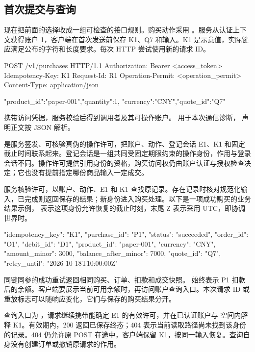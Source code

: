 \subsection*{首次提交与查询}

现在把前面的选择收成一组可检查的接口规则。购买动作采用 。服务从认证上下文获得账户 1，客户端在首次发送前保存 K1、Q7 和输入。K1 是示意值，实际键应满足公布的字符和长度要求。每次 HTTP 尝试使用新的请求 ID。

\begin{BookCode}
POST /v1/purchases HTTP/1.1
Authorization: Bearer <access_token>
Idempotency-Key: K1
Request-Id: R1
Operation-Permit: <operation_permit>
Content-Type: application/json

{"product_id":"paper-001","quantity":1,
 "currency":"CNY","quote_id":"Q7"}
\end{BookCode}

 携带访问凭据，服务校验后得到调用者及其可操作账户。 用于本次通信诊断， 声明正文按 JSON 解析。

 是服务签发、可核验真伪的操作许可，把账户、动作、登记会话 E1、K1 和固定截止时间联系起来。登记会话是一组共同受固定期限约束的操作身份，作用与登录会话不同。操作许可提供引用身份的资格，购买访问权仍由账户认证与授权检查决定；它也没有提前指定哪份商品输入一定成交。

服务核验许可，以账户、动作、E1 和 K1 查找原记录。存在记录时核对规范化输入，已完成则返回保存的结果；新身份进入购买处理。以下是一项成功购买的业务结果示例， 表示这项身份允许恢复的截止时刻，末尾 Z 表示采用 UTC，即协调世界时。

\begin{BookCode}
{
  "idempotency_key": "K1",
  "purchase_id": "P1",
  "status": "succeeded",
  "order_id": "O1",
  "debit_id": "D1",
  "product_id": "paper-001",
  "currency": "CNY",
  "amount_minor": 3000,
  "balance_after_minor": 7000,
  "quote_id": "Q7",
  "retry_until": "2026-10-18T10:00:00Z"
}
\end{BookCode}

同键同参的成功重试返回相同购买、订单、扣款和成交快照。 始终表示 P1 扣款后的余额。客户端要展示当前可用余额时，再访问账户查询入口。本次请求 ID 或重放标志可以随响应变化，它们与保存的购买结果分开。

查询入口为 ，请求继续携带能确定 E1 的有效许可，并在已认证账户与  空间内解释 K1。有效期内，200 返回已保存终态；404 表示当前读取路径尚未找到该身份的记录。404 仍允许原 POST 在途中，客户端保留 K1，按同一输入恢复。查询自身没有创建订单或撤销原请求的作用。

